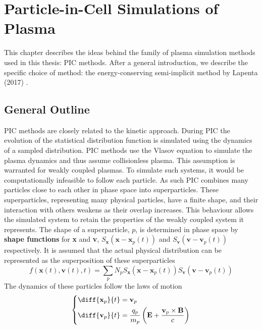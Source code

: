 \chapter{Particle-in-Cell Simulations of Plasma}
\label{cha: pic}
This chapter describes the ideas behind the family of plasma simulation methods used in this thesis: PIC methods. After a general introduction, we describe the specific choice of method: the energy-conserving semi-implicit method by Lapenta (2017) \cite{lapenta_exactly_2017}.

\section{General Outline}
PIC methods are closely related to the kinetic approach. During PIC the evolution of the statistical distribution function is simulated using the dynamics of a sampled distribution. PIC methods use the Vlasov equation to simulate the plasma dynamics and thus assume collisionless plasma. This assumption is warranted for weakly coupled plasmas. To simulate such systems, it would be computationally infeasible to follow each particle. As such PIC combines many particles close to each other in phase space into superparticles. These superparticles, representing many physical particles, have a finite shape, and their interaction with others weakens as their overlap increases. This behaviour allows the simulated system to retain the properties of the weakly coupled system it represents. The shape of a superparticle, $p$, is determined in phase space by \textbf{shape functions} for \textbf{x} and \textbf{v}, $S_{\textbf{x}}(\textbf{x}-\textbf{x}_p(t))$ and $S_{\textbf{v}}(\textbf{v}-\textbf{v}_p(t))$ respectively. It is assumed that the actual physical distribution can be represented as the superposition of these superparticles \cite{markidis_multi-scale_2010}
\begin{equation}
    f(\textbf{x}(t),\textbf{v}(t),t) = \sum_{p}N_pS_{\textbf{x}}(\textbf{x}-\textbf{x}_p(t))S_{\textbf{v}}(\textbf{v}-\textbf{v}_p(t))
\end{equation}
The dynamics of these particles follow the laws of motion
\begin{equation} \label{eq: cont particle mover}
\left\{\begin{aligned} 
	\diff{{\textbf{x}_p}}{t} &= \textbf{v}_p \\
	\diff{{\textbf{v}_p}}{t} &= \frac{q_p}{m_p}\left(\textbf{E} + \frac{\textbf{v}_p\times \textbf{B}}{c}\right)
\end{aligned}\right.
\end{equation}
